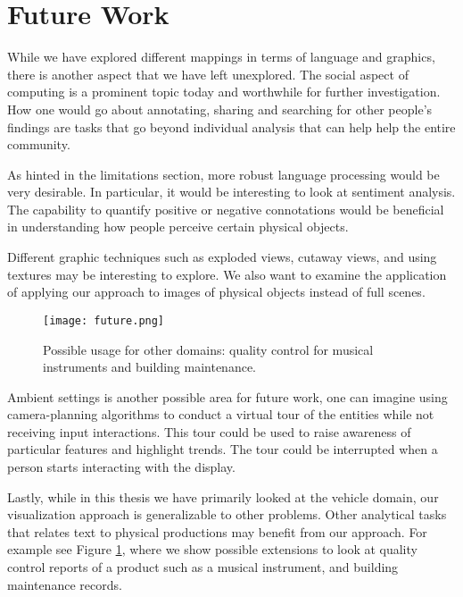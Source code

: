  

\section{Future Work}
While we have explored different mappings in terms of language and graphics,
there is another aspect that we have left unexplored. The social aspect of
computing is a prominent topic today and worthwhile for further investigation.
How one would go about annotating, sharing and searching for other people's
findings are tasks that go beyond individual analysis that can help help the
entire community.


As hinted in the limitations section, more robust language processing would be very
desirable. In particular, it would be interesting to look at sentiment analysis.
The capability to quantify positive or negative connotations would be beneficial
in understanding how people perceive certain physical objects. 

Different graphic techniques such as exploded views, cutaway views, and using textures may be interesting
to explore. We also want to examine the application of applying our approach to \twod images of physical 
objects instead of full \threed scenes.

	\begin{figure}
	 \centering  
	 \texttt{[image: future.png]}  
	 \caption[Other Uses]{Possible usage for other domains: quality control for
	 musical instruments and building maintenance.}
	 \label{figure:future}
	\end{figure}

Ambient settings is another possible area for future work, one can imagine using
camera-planning algorithms to conduct a virtual tour of the entities while not
receiving input interactions. This tour could be used to raise awareness of
particular features and highlight trends. The tour could be interrupted when a
person starts interacting with the display.

Lastly, while in this thesis we have primarily looked at the vehicle domain, our
visualization approach is generalizable to other problems. Other analytical
tasks that relates text to physical productions may benefit from our approach. For
example see Figure \ref{figure:future}, where we show possible extensions
to look at quality control reports of a product such as a musical instrument,
and building maintenance records.


